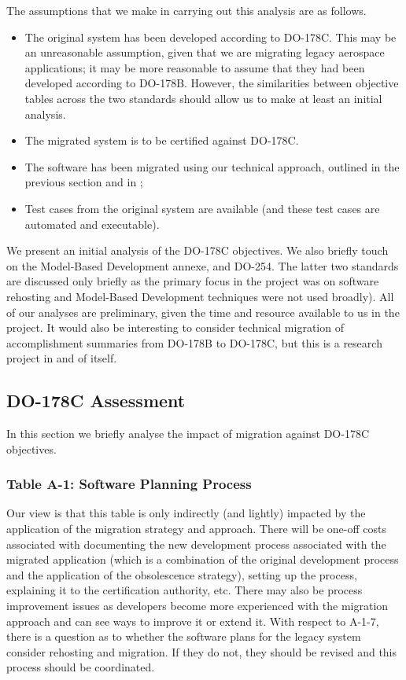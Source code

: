 \documentclass{llncs}
\begin{document}
The assumptions that we make in carrying out this analysis are as follows.
\begin{itemize}
\item The original system has been developed according to DO-178C. This may be an unreasonable assumption, given that we are migrating legacy aerospace applications; it may be more reasonable to assume that they had been developed according to DO-178B. However, the similarities between objective tables across the two standards should allow us to make at least an initial analysis.
\item The migrated system is to be certified against DO-178C.
\item The software has been migrated using our technical approach, outlined in the previous section and in \cite{Gerasimou2017};
\item Test cases from the original system are available (and these test cases are automated and executable).
\end{itemize}
We present an initial analysis of the DO-178C objectives. We also briefly touch on the Model-Based Development annexe, and DO-254. The latter two standards are discussed only briefly as the primary focus in the project was on software rehosting and Model-Based Development techniques were not used broadly). All of our analyses are preliminary, 
given the time and resource available to us in the project. It would also be interesting to consider technical migration of accomplishment summaries from DO-178B to DO-178C, but this is a research project in and of itself.

\subsection{DO-178C Assessment}
\label{sec:DO178C}
In this section we briefly analyse the impact of migration against DO-178C objectives.

\subsubsection{Table A-1: Software Planning Process}
Our view is that this table is only indirectly (and lightly) impacted by the application of the migration strategy and approach. There will be one-off costs associated with documenting the new development process associated with the migrated application (which is a combination of the original development process and the application of the obsolescence strategy), setting up the process, explaining it to the certification authority, etc. There may also be process improvement issues as developers become more experienced with the migration approach and can see ways to improve it or extend it. With respect to A-1-7, there is a question as to whether the software plans for the legacy system consider rehosting and migration. If they do not, they should be revised and this process should be coordinated.
\end{document}
